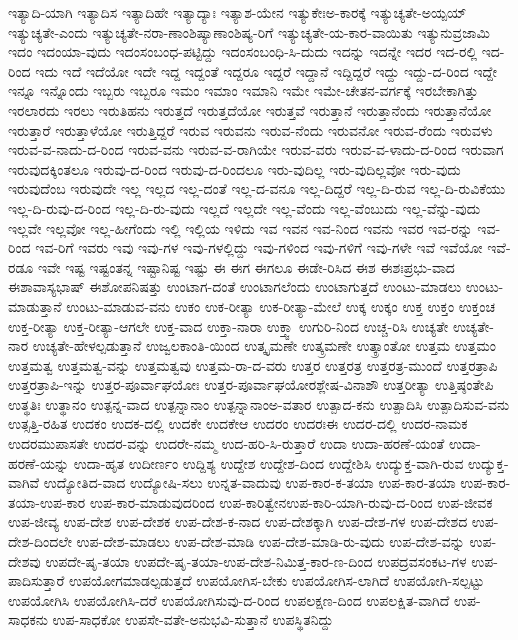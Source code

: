 {ಇತ್ಯಾದಿ-ಯಾಗಿ
ಇತ್ಯಾದಿಸ
ಇತ್ಯಾದಿಹೇ
ಇತ್ಯಾದ್ಯಾಃ
ಇತ್ಯಾಶ-ಯೇನ
ಇತ್ಯುಕೇಃಅ-ಕಾರಕ್ಕೆ
ಇತ್ಯುಚ್ಯತೇ-ಅಯ್ಪಯ್
ಇತ್ಯುಚ್ಯತೇ-ಎಂದು
ಇತ್ಯುಚ್ಯತೇ-ನರಾ-ಣಾಂಶಿಷ್ಯಾಣಾಂಶಿಷ್ಯ-ರಿಗೆ
ಇತ್ಯುಚ್ಯತೇ-ಯ-ಕಾರ-ವಾಯಿತು
ಇತ್ಯುನುವ್ರಜಾಮಿ
ಇದಂ
ಇದಂಯಾ-ವುದು
ಇದಂಸಂಬಂಧ-ಪಟ್ಟಿದ್ದು
ಇದಂಸಂಬಂಧಿ-ಸಿ-ದುದು
ಇದನ್ನು
ಇದನ್ನೇ
ಇದರ
ಇದ-ರಲ್ಲಿ
ಇದ-ರಿಂದ
ಇದು
ಇದೆ
ಇದೆಯೋ
ಇದೇ
ಇದ್ದ
ಇದ್ದಂತೆ
ಇದ್ದರೂ
ಇದ್ದರೆ
ಇದ್ದಾನೆ
ಇದ್ದಿದ್ದರೆ
ಇದ್ದು
ಇದ್ದು-ದ-ರಿಂದ
ಇದ್ದೇ
ಇನ್ನೂ
ಇನ್ನೊಂದು
ಇಬ್ಬರು
ಇಬ್ಬರೂ
ಇಮಂ
ಇಮಾಂ
ಇಮಾನಿ
ಇಮೇ
ಇಮೇ-ಚೇತನ-ವರ್ಗಕ್ಕೆ
ಇರಬೇಕಾಗಿತ್ತು
ಇರಲಾರದು
ಇರಲು
ಇರುತಿಹನು
ಇರುತ್ತದೆ
ಇರುತ್ತದೆಯೋ
ಇರುತ್ತವೆ
ಇರುತ್ತಾನೆ
ಇರುತ್ತಾನೆಂದು
ಇರುತ್ತಾನೆಯೋ
ಇರುತ್ತಾರೆ
ಇರುತ್ತಾಳೆಯೋ
ಇರುತ್ತಿದ್ದರೆ
ಇರುವ
ಇರುವನು
ಇರುವ-ನೆಂದು
ಇರುವನೋ
ಇರುವ-ರೆಂದು
ಇರುವಳು
ಇರುವ-ವ-ನಾದು-ದ-ರಿಂದ
ಇರುವ-ವನು
ಇರುವ-ವ-ರಾಗಿಯೇ
ಇರುವ-ವರು
ಇರುವ-ವ-ಳಾದು-ದ-ರಿಂದ
ಇರುವಾಗ
ಇರುವುದಕ್ಕಿಂತಲೂ
ಇರುವು-ದ-ರಿಂದ
ಇರುವು-ದ-ರಿಂದಲೂ
ಇರು-ವುದಿಲ್ಲ
ಇರು-ವುದಿಲ್ಲವೋ
ಇರು-ವುದು
ಇರುವುದೆಂಬ
ಇರುವುದೇ
ಇಲ್ಲ
ಇಲ್ಲದ
ಇಲ್ಲ-ದಂತೆ
ಇಲ್ಲ-ದ-ವನೂ
ಇಲ್ಲ-ದಿದ್ದರೆ
ಇಲ್ಲ-ದಿ-ರುವ
ಇಲ್ಲ-ದಿ-ರುವಿಕೆಯು
ಇಲ್ಲ-ದಿ-ರುವು-ದ-ರಿಂದ
ಇಲ್ಲ-ದಿ-ರು-ವುದು
ಇಲ್ಲದೆ
ಇಲ್ಲದೇ
ಇಲ್ಲ-ವೆಂದು
ಇಲ್ಲ-ವೆಂಬುದು
ಇಲ್ಲ-ವೆನ್ನು-ವುದು
ಇಲ್ಲವೇ
ಇಲ್ಲವೋ
ಇಲ್ಲ-ಹೀಗೆಂದು
ಇಲ್ಲಿ
ಇಲ್ಲಿಯ
ಇಳಿದು
ಇವ
ಇವನ
ಇವ-ನಿಂದ
ಇವನು
ಇವರ
ಇವ-ರನ್ನು
ಇವ-ರಿಂದ
ಇವ-ರಿಗೆ
ಇವರು
ಇವು
ಇವು-ಗಳ
ಇವು-ಗಳಲ್ಲಿದ್ದು
ಇವು-ಗಳಿಂದ
ಇವು-ಗಳಿಗೆ
ಇವು-ಗಳೇ
ಇವೆ
ಇವೆಯೋ
ಇವೆ-ರಡೂ
ಇವೇ
ಇಷ್ಟ
ಇಷ್ಟಂತನ್ನ
ಇಷ್ಟಾನಿಷ್ಟ
ಇಷ್ಟು
ಈ
ಈಗ
ಈಗಲೂ
ಈಡೇ-ರಿಸಿದ
ಈಶ
ಈಶಃಪ್ರಭು-ವಾದ
ಈಶಾವಾಸ್ಯಭಾಷ್
ಈಶೋಪನಿಷತ್ತು
ಉಂಟಾಗ-ದಂತೆ
ಉಂಟಾಗಲೆಂದು
ಉಂಟಾಗುತ್ತದೆ
ಉಂಟು-ಮಾಡಲು
ಉಂಟು-ಮಾಡುತ್ತಾನೆ
ಉಂಟು-ಮಾಡುವ-ವನು
ಉಕಂ
ಉಕ-ರೀತ್ಯಾ
ಉಕ-ರೀತ್ಯಾ-ಮೇಲೆ
ಉಕ್ಕ
ಉಕ್ಕಂ
ಉಕ್ತ
ಉಕ್ತಂ
ಉಕ್ತಂಚ
ಉಕ್ತ-ರೀತ್ಯಾ
ಉಕ್ತ-ರೀತ್ಯಾ-ಆಗಲೇ
ಉಕ್ತ-ವಾದ
ಉಕ್ತಾ-ನಾರಾ
ಉಕ್ತ್ವಾ
ಉಗುರಿ-ನಿಂದ
ಉಚ್ಚ-ರಿಸಿ
ಉಚ್ಯತೇ
ಉಚ್ಯತೇ-ನಾರ
ಉಚ್ಯತೇ-ಹೇಳಲ್ಪಡುತ್ತಾನೆ
ಉಜ್ವಲಕಾಂತಿ-ಯಿಂದ
ಉತ್ಕೃಮಣೇ
ಉತ್ಕ್ರಮಣೇ
ಉತ್ಕ್ರಾಂತೋ
ಉತ್ತಮ
ಉತ್ತಮಂ
ಉತ್ತಮತ್ವ
ಉತ್ತಮತ್ವ-ವನ್ನು
ಉತ್ತಮತ್ವವು
ಉತ್ತಮ-ರಾ-ದ-ವರು
ಉತ್ತರ
ಉತ್ತರತ್ರ
ಉತ್ತರತ್ರ-ಮುಂದೆ
ಉತ್ತರತ್ರಾಪಿ
ಉತ್ತರತ್ರಾಪಿ-ಇನ್ನು
ಉತ್ತರ-ಪೂರ್ವಾಘಯೋಃ
ಉತ್ತರ-ಪೂರ್ವಾಘಯೋರಶ್ಲೇಷ-ವಿನಾಶೌ‌
ಉತ್ತರೀತ್ಯಾ
ಉತ್ತಿಷ್ಠಂತೇಪಿ
ಉತ್ಥತಿಃ
ಉತ್ಥಾನಂ
ಉತ್ಪನ್ನ-ವಾದ
ಉತ್ಪನ್ನಾನಾಂ
ಉತ್ಪನ್ನಾನಾಂಅ-ವತಾರ
ಉತ್ಪಾದ-ಕನು
ಉತ್ಪಾದಿಸಿ
ಉತ್ಪಾದಿಸುವ-ವನು
ಉತ್ಸತ್ತಿ-ರಹಿತ
ಉದಕಂ
ಉದಕ-ದಲ್ಲಿ
ಉದಕೇ
ಉದಕೇಆ
ಉದರಂ
ಉದರಃಈ
ಉದರ-ದಲ್ಲಿ
ಉದರ-ನಾಮಕ
ಉದರಮುಪಾಸತೇ
ಉದರ-ವನ್ನು
ಉದರೇ-ನಮ್ಮ
ಉದ-ಹರಿ-ಸಿ-ರುತ್ತಾರೆ
ಉದಾ
ಉದಾ-ಹರಣೆ-ಯಂತೆ
ಉದಾ-ಹರಣೆ-ಯನ್ನು
ಉದಾ-ಹೃತ
ಉದೀರ್ಣಂ
ಉದ್ದಿಶ್ಯ
ಉದ್ದೇಶ
ಉದ್ದೇಶ-ದಿಂದ
ಉದ್ದೇಶಿಸಿ
ಉದ್ಯುಕ್ತ-ವಾಗಿ-ರುವ
ಉದ್ಯುಕ್ತ-ವಾಗಿವೆ
ಉದ್ಯೋತಿದ-ವಾದ
ಉದ್ಯೋಷಿ-ಸಲು
ಉನ್ನತ-ವಾದುವು
ಉಪ-ಕಾರ-ಕ-ತಯಾ
ಉಪ-ಕಾರ-ತಯಾ
ಉಪ-ಕಾರ-ತಯಾ-ಉಪ-ಕಾರ
ಉಪ-ಕಾರ-ಮಾಡುವುದರಿಂದ
ಉಪ-ಕಾರಿತ್ವೇನಉಪ-ಕಾರಿ-ಯಾಗಿ-ರುವು-ದ-ರಿಂದ
ಉಪ-ಜೀವಕ
ಉಪ-ಜೀವ್ಯ
ಉಪ-ದೇಶ
ಉಪ-ದೇಶಕ
ಉಪ-ದೇಶ-ಕ-ನಾದ
ಉಪ-ದೇಶಕ್ಕಾಗಿ
ಉಪ-ದೇಶ-ಗಳ
ಉಪ-ದೇಶದ
ಉಪ-ದೇಶ-ದಿಂದಲೇ
ಉಪ-ದೇಶ-ಮಾಡಲು
ಉಪ-ದೇಶ-ಮಾಡಿ
ಉಪ-ದೇಶ-ಮಾಡಿ-ರು-ವುದು
ಉಪ-ದೇಶ-ವನ್ನು
ಉಪ-ದೇಶವು
ಉಪದೇ-ಷೃ-ತಯಾ
ಉಪದೇ-ಷೃ-ತಯಾ-ಉಪ-ದೇಶ-ನಿಮಿತ್ತ-ಕಾರ-ಣ-ದಿಂದ
ಉಪದ್ರವಸಂಕಟ-ಗಳ
ಉಪ-ಪಾದಿಸುತ್ತಾರೆ
ಉಪಯೋಗಮಾಡಲ್ಪಡುತ್ತದೆ
ಉಪಯೋಗಿಸ-ಬೇಕು
ಉಪಯೋಗಿಸ-ಲಾಗಿದೆ
ಉಪಯೋಗಿ-ಸಲ್ಪಟ್ಟು
ಉಪಯೋಗಿಸಿ
ಉಪಯೋಗಿಸಿ-ದರೆ
ಉಪಯೋಗಿಸುವು-ದ-ರಿಂದ
ಉಪಲಕ್ಷಣ-ದಿಂದ
ಉಪಲಕ್ಷಿತ-ವಾಗಿದೆ
ಉಪ-ಸಾಧಕನು
ಉಪ-ಸಾಧಕೋ
ಉಪಸೇ-ವತೇ-ಅನುಭವಿ-ಸುತ್ತಾನೆ
ಉಪಸ್ಥಿತನಿದ್ದು
}
